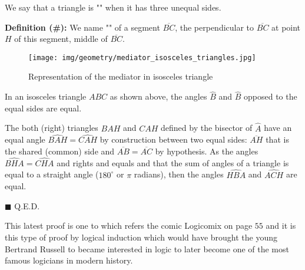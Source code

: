 	\begin{tcolorbox}[title=Remark,colframe=black,arc=10pt]
	We say that a triangle is "" when it has three unequal sides.
	\end{tcolorbox}
	\textbf{Definition (\#\mydef):} We name "\label{mediator}" of a segment $\overline{BC}$, the perpendicular to $\overline{BC}$ at point $H$ of this segment, middle of $\overline{BC}$.
	\begin{figure}[H]
		\centering
		\texttt{[image: img/geometry/mediator\_isosceles\_triangles.jpg]}
		\caption{Representation of the mediator in isosceles triangle}
	\end{figure}
	\begin{theorem}
	In an isosceles triangle $ABC$ as shown above, the angles $\hat{B}$ and $\hat{B}$ opposed to the equal sides are equal.
	\end{theorem}
	
	\begin{dem}
	The both (right) triangles $BAH$ and $CAH$ defined by the bisector of  $\widehat{A}$ have an equal angle $\widehat{BAH}=\widehat{CAH}$ by construction between two equal sides: $\overline{AH}$ that is the shared (common) side and $\overline{AB} = \overline{AC}$ by hypothesis. As the angles $\widehat{BHA}=\widehat{CHA}$ and rights and equals and that the sum of angles of a triangle is equal to a straight angle ($180^\circ$ or $\pi$ radians), then the angles $\widehat{HBA}$ and $\widehat{ACH}$ are equal.
	\begin{flushright}
		$\blacksquare$  Q.E.D.
	\end{flushright}
	\end{dem}
	\begin{tcolorbox}[title=Remark,colframe=black,arc=10pt]
	This latest proof is one to which refers the comic Logicomix on page $55$ and it is this type of proof by logical induction which would have brought the young Bertrand Russell to became interested in logic to later become one of the most famous logicians in modern history.
	\end{tcolorbox}
	
